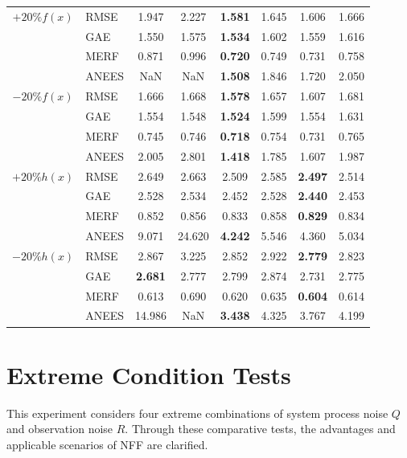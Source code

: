 \begin{Table}[ht]
\begin{tabular}{|c|l|c|c|cc|cc|}
		{$+20\% f(x)$}
		& RMSE  & 1.947 & 2.227 & \textbf{1.581} & 1.645 & 1.606 & 1.666 \\
		& GAE   & 1.550 & 1.575 & \textbf{1.534} & 1.602 & 1.559 & 1.616 \\
		& MERF  & 0.871 & 0.996 & \textbf{0.720} & 0.749 & 0.731 & 0.758 \\
		& ANEES & NaN   & NaN   & \textbf{1.508} & 1.846 & 1.720 & 2.050 \\ \hline
		
		{$-20\% f(x)$}
		& RMSE  & 1.666 & 1.668 & \textbf{1.578} & 1.657 & 1.607 & 1.681 \\
		& GAE   & 1.554 & 1.548 & \textbf{1.524} & 1.599 & 1.554 & 1.631 \\
		& MERF  & 0.745 & 0.746 & \textbf{0.718} & 0.754 & 0.731 & 0.765 \\
		& ANEES & 2.005 & 2.801 & \textbf{1.418} & 1.785 & 1.607 & 1.987 \\ \hline
		
		{$+20\% h(x)$}
		& RMSE  & 2.649 & 2.663 & 2.509 & 2.585 & \textbf{2.497} & 2.514 \\
		& GAE   & 2.528 & 2.534 & 2.452 & 2.528 & \textbf{2.440} & 2.453 \\
		& MERF  & 0.852 & 0.856 & 0.833 & 0.858 & \textbf{0.829} & 0.834 \\
		& ANEES & 9.071 & 24.620& \textbf{4.242} & 5.546 & 4.360 & 5.034 \\ \hline
		
		{$-20\% h(x)$}
		& RMSE  & 2.867 & 3.225 & 2.852 & 2.922 & \textbf{2.779} & 2.823 \\
		& GAE   & \textbf{2.681} & 2.777 & 2.799 & 2.874 & 2.731 & 2.775 \\
		& MERF  & 0.613 & 0.690 & 0.620 & 0.635 & \textbf{0.604} & 0.614 \\
		& ANEES & 14.986 & NaN  & \textbf{3.438} & 4.325 & 3.767 & 4.199 \\ \hline
	\end{tabular}
\end{Table}

\clearpage

\section{Extreme Condition Tests}
\label{sec:extreme_conditions}

This experiment considers four extreme combinations of system process noise $Q$ and observation noise $R$. Through these comparative tests, the advantages and applicable scenarios of NFF are clarified.

